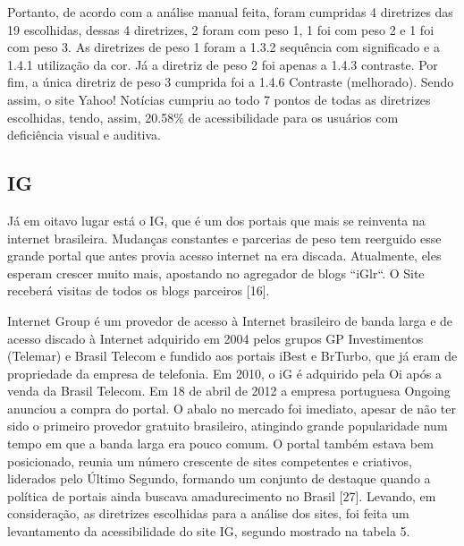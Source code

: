 \documentclass[a4paper]{article}
\begin{document}
\begin{titlepage}
Portanto, de acordo com a análise manual feita, foram cumpridas 4 diretrizes das 19 escolhidas, dessas 4 diretrizes, 2 foram com peso 1, 1 foi com peso 2 e 1 foi com peso 3. As diretrizes de peso 1 foram a 1.3.2 sequência com significado e a 1.4.1 utilização da cor. Já a diretriz de peso 2 foi apenas a 1.4.3 contraste. Por fim, a única diretriz de peso 3 cumprida foi a 1.4.6 Contraste (melhorado). Sendo assim, o site Yahoo! Notícias cumpriu ao todo 7 pontos de todas as diretrizes escolhidas, tendo, assim, 20.58\% de acessibilidade para os usuários com deficiência visual e auditiva.

\subsection{IG}

Já em oitavo lugar está o IG, que é um dos portais que mais se reinventa na internet brasileira. Mudanças constantes e parcerias de peso tem reerguido esse grande portal que antes provia acesso internet na era discada. Atualmente, eles esperam crescer muito mais, apostando no agregador de blogs “iGlr“. O Site receberá visitas de todos os blogs parceiros [16].

Internet Group é um provedor de acesso à Internet brasileiro de banda larga e de acesso discado à Internet adquirido em 2004  pelos grupos GP Investimentos (Telemar) e Brasil Telecom e fundido aos portais iBest e BrTurbo, que já eram de propriedade da empresa de telefonia. Em 2010, o iG é adquirido pela Oi após a venda da Brasil Telecom. Em 18 de abril de 2012 a empresa portuguesa Ongoing anunciou a compra do portal. O abalo no mercado foi imediato, apesar de não ter sido o primeiro provedor gratuito brasileiro, atingindo grande popularidade num tempo em que a banda larga era pouco comum. O portal também estava bem posicionado, reunia um número crescente de sites competentes e criativos, liderados pelo Último Segundo, formando um conjunto de destaque quando a política de portais ainda buscava amadurecimento no Brasil [27]. Levando, em consideração, as diretrizes escolhidas para a análise dos sites, foi feita um levantamento da acessibilidade do site IG, segundo mostrado na tabela 5.\\


\end{titlepage}
\end{document}
